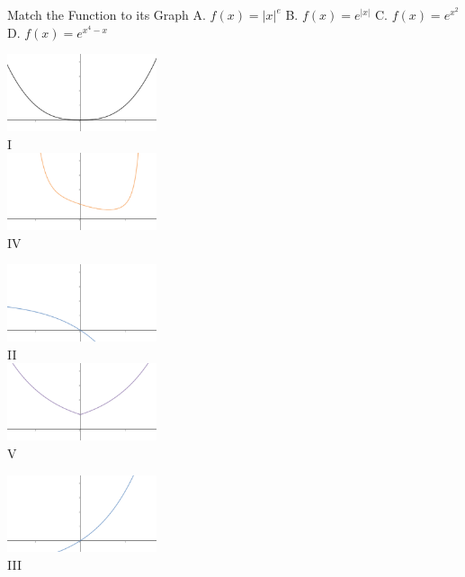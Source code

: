 \begin{frame}[t]{Match the Function to its Graph}\AnswerNo{}
A. $f(x)=|x|^e$\hfill
B. $f(x)=e^{|x|}$\hfill
C. $f(x)=e^{x^2}$\hfill
D. $f(x)=e^{x^4-x}$\vfill

\begin{multicols}{3}\centering
\includegraphics[width=0.33\textwidth]{fig/E1}\\
I\\[3em]

\includegraphics[width=0.33\textwidth]{fig/E2}\\
\textcolor{M5}{IV}
\columnbreak

\includegraphics[width=0.33\textwidth]{fig/E6}\\
\textcolor{C4}{II}\\[3em]

\includegraphics[width=0.33\textwidth]{fig/E3}\\
\textcolor{C3}{V}
\columnbreak

\includegraphics[width=0.33\textwidth]{fig/E5}\\
\textcolor{C1}{III}\\[3em]


\end{multicols}
\end{frame}
